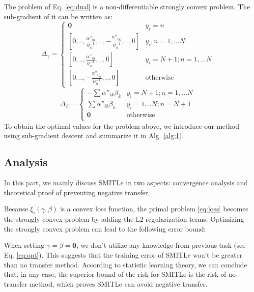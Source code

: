 The problem of Eq. \eqref{eq:dual} is a non-differentiable strongly convex problem. The sub-gradient of it can be written as:
\begin{equation*}
{\Delta _\gamma }=\begin{cases}
\boldsymbol{0}&{y_i}=n\\
\left[ {0,..,\frac{{\alpha ''}_{in}}{\psi _{ii}^{ - 1}},.., - \frac{{\alpha ''}_{i{y_i}}}{\psi _{ii}^{ - 1}},..,0} \right]&{y_i},n = 1,...N\\
\left[ {0,..,\frac{{\alpha ''}_{in}}{\psi _{ii}^{ - 1}},..,0} \right]&{y_i} = N + 1;n = 1,...N\\
\left[ {0,.., - \frac{{\alpha ''}_{i{y_i}}}{\psi _{ii}^{ - 1}},..,0} \right]&\text{otherwise}
\end{cases}
\end{equation*}
\begin{equation*}
{\Delta _\beta }=\begin{cases}
 - \sum {{{\alpha ''}_{ik}}{\beta _k}} &{y_i} = N + 1;n = 1,...N\\
 \sum {{{\alpha ''}_{ik}}{\beta _k}} &{y_i} = 1,..N;n = N+1\\
\boldsymbol{0}&\text{otherwise}\\
\end{cases}
\end{equation*}
To obtain the optimal values for the problem above, we introduce our method using sub-gradient descent \cite{BoydCO} and summarize it in Alg. \ref{alg:1}. 


\subsection{Analysis}\label{subsec:analysis}
In this part, we mainly discuss SMITLe in two aspects: convergence analysis and theoretical proof of preventing negative transfer.

Because $\xi_i(\gamma,\beta)$ is a convex loss function, the primal problem \eqref{eq:loss} becomes the strongly convex problem by adding the L2 regularization terms. Optimizing the strongly convex problem can lead to the following error bound:



When setting $\gamma=\beta = \mathbf{0}$, we don't utilize any knowledge from previous task (see Eq. \eqref{eq:opt}).
This suggests that the training error of SMITLe won't be greater than no transfer method. 
According to statistic learning theory, we can conclude that, in any case, the superior bound of the risk for SMITLe is the risk of no transfer method, which proves SMITLe can avoid negative transfer.
